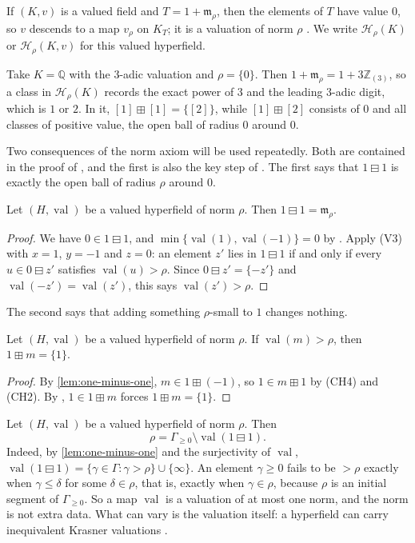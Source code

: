 \documentclass[11pt]{amsart}
\numberwithin{equation}{section}
\newcommand{\hplus}{\boxplus}
\newcommand{\hminus}{\boxminus}
\newcommand{\val}{\operatorname{val}}
\newcommand{\m}{\mathfrak m}
\newcommand{\Hr}{\mathcal H_\rho}
\newcommand{\Z}{\mathbb Z}
\newcommand{\cls}[1]{[#1]}
\begin{document}
If $(K,v)$ is a valued field and $T=1+\m_\rho$, then the elements of $T$ have value $0$, so $v$ descends to a map $v_\rho$ on $K_T$; it is a valuation of norm $\rho$ \cite[Section~1.2]{LT25}. We write $\Hr(K)$ or $\Hr(K,v)$ for this valued hyperfield.

\begin{example}\label{ex:Hrho}
Take $K=\mathbb Q$ with the $3$-adic valuation and $\rho=\{0\}$. Then $1+\m_\rho=1+3\Z_{(3)}$, so a class in $\Hr(K)$ records the exact power of $3$ and the leading $3$-adic digit, which is $1$ or $2$. In it, $\cls1\hplus\cls1=\{\cls2\}$, while $\cls1\hplus\cls{2}$ consists of $0$ and all classes of positive value, the open ball of radius $0$ around $0$.
\end{example}

Two consequences of the norm axiom will be used repeatedly. Both are contained in the proof of \cite[Lemma~1.25]{LT25}, and the first is also the key step of \cite[Proposition~4.14]{Linzi25}. The first says that $1\hminus1$ is exactly the open ball of radius $\rho$ around $0$.

\begin{lemma}\label{lem:one-minus-one}
Let $(H,\val)$ be a valued hyperfield of norm $\rho$. Then $1\hminus 1=\m_\rho$.
\end{lemma}

\begin{proof}
We have $0\in 1\hminus 1$, and $\min\{\val(1),\val(-1)\}=0$ by \cite[Lemma~1.10]{LT25}. Apply (V3) with $x=1$, $y=-1$ and $z=0$: an element $z'$ lies in $1\hminus1$ if and only if every $u\in 0\hminus z'$ satisfies $\val(u)>\rho$. Since $0\hminus z'=\{-z'\}$ and $\val(-z')=\val(z')$, this says $\val(z')>\rho$.
\end{proof}

The second says that adding something $\rho$-small to $1$ changes nothing.

\begin{lemma}\label{lem:absorb}
Let $(H,\val)$ be a valued hyperfield of norm $\rho$. If $\val(m)>\rho$, then $1\hplus m=\{1\}$.
\end{lemma}

\begin{proof}
By \cref{lem:one-minus-one}, $m\in 1\hplus(-1)$, so $1\in m\hplus 1$ by (CH4) and (CH2). By \cite[Lemma~1.12]{LT25}, $1\in 1\hplus m$ forces $1\hplus m=\{1\}$.
\end{proof}

\begin{remark}\label{rem:norm-intrinsic}
Let $(H,\val)$ be a valued hyperfield of norm $\rho$. Then
\[
  \rho=\Gamma_{\ge0}\setminus\val(1\hminus1).
\]
Indeed, by \cref{lem:one-minus-one} and the surjectivity of $\val$, $\val(1\hminus1)=\{\gamma\in\Gamma:\gamma>\rho\}\cup\{\infty\}$. An element $\gamma\ge0$ fails to be $>\rho$ exactly when $\gamma\le\delta$ for some $\delta\in\rho$, that is, exactly when $\gamma\in\rho$, because $\rho$ is an initial segment of $\Gamma_{\ge0}$. So a map $\val$ is a valuation of at most one norm, and the norm is not extra data. What can vary is the valuation itself: a hyperfield can carry inequivalent Krasner valuations \cite[Example~4.24]{Linzi25}.
\end{remark}
\end{document}

